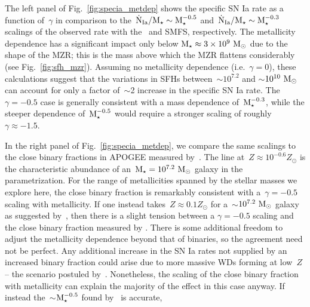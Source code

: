 \documentclass[ms.tex]{subfiles}
\begin{document}
The left panel of Fig.~\ref{fig:specia_metdep} shows the specific SN Ia rate
as a function of~$\gamma$ in comparison to the~$\dot{\text{N}}_\text{Ia} /
\text{M}_\star \sim \text{M}_\star^{-0.5}$ and~$\dot{\text{N}}_\text{Ia} / \text{M}_\star \sim
\text{M}_\star^{-0.3}$ scalings of the observed rate with the~\citet{Bell2003} and
\citet{Baldry2012} SMFS, respectively.
The metallicity dependence has a significant impact only below
$\text{M}_\star \approx 3\times10^9~\text{M}_\odot$ due to the shape of the MZR;
this is the mass above which the MZR flattens considerably (see
Fig.~\ref{fig:sfh_mzr}).
Assuming no metallicity dependence (i.e.~$\gamma = 0$), these calculations
suggest that the variations in SFHs between~$\sim$$10^{7.2}$ and
$\sim$$10^{10}~\text{M}_\odot$ can account for only a factor of~$\sim$2 increase in the
specific SN Ia rate.
The~$\gamma = -0.5$ case is generally consistent with a mass dependence
of~$\text{M}_\star^{-0.3}$, while the steeper dependence of~$\text{M}_\star^{-0.5}$ would
require a stronger scaling of roughly~$\gamma \approx -1.5$.
\par
In the right panel of Fig.~\ref{fig:specia_metdep}, we compare the same
scalings to the close binary fractions in APOGEE measured by~\citet{Moe2019}.
The line at~$Z \approx 10^{-0.6} Z_\odot$ is the characteristic abundance of
an~$\text{M}_\star = 10^{7.2}~\text{M}_\odot$ galaxy in the~\citet{Zahid2014} parametrization.
For the range of metallicities spanned by the stellar masses we explore here,
the close binary fraction is remarkably consistent with a~$\gamma = -0.5$
scaling with metallicity.
If one instead takes~$Z \approx 0.1Z_\odot$ for a~$\sim$$10^{7.2}~\text{M}_\odot$ galaxy
as suggested by~\citet{Andrews2013}, then there is a slight tension between a
$\gamma = -0.5$ scaling and the close binary fraction measured by
\citet{Moe2019}.
There is some additional freedom to adjust the metallicity dependence beyond
that of binaries, so the agreement need not be perfect.
Any additional increase in the SN Ia rates not supplied by an increased binary
fraction could arise due to more massive WDs forming at low~$Z$ -- the scenario
postuled by~\citet{Kistler2013}.
Nonetheless, the scaling of the close binary fraction with metallicity can
explain the majority of the effect in this case anyway.
If instead the~$\sim$$\text{M}_\star^{-0.5}$ found by~\citet{Brown2019} is accurate,
\end{document}
